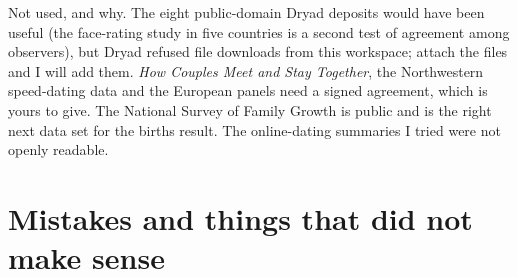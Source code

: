 \documentclass[10pt,letterpaper]{extarticle}
\begin{document}
Not used, and why. The eight public-domain Dryad deposits would have been useful (the face-rating study in five countries
is a second test of agreement among observers), but Dryad refused file downloads from this workspace; attach the files and
I will add them. \emph{How Couples Meet and Stay Together}, the Northwestern speed-dating data and the European panels need a
signed agreement, which is yours to give. The National Survey of Family Growth is public and is the right next data set
for the births result. The online-dating summaries I tried were not openly readable.

\section{Mistakes and things that did not make sense}
\end{document}
